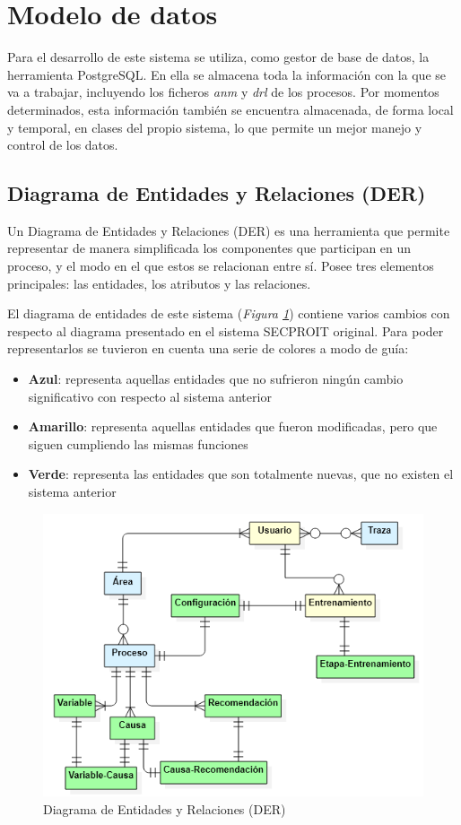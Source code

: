 
\section{Modelo de datos}
Para el desarrollo de este sistema se utiliza, como gestor de base de datos, la herramienta PostgreSQL. En ella se almacena toda la información con la que se va a trabajar, incluyendo los ficheros \textsl{anm} y \textsl{drl} de los procesos. Por momentos determinados, esta información también se encuentra almacenada, de forma local y temporal, en clases del propio sistema, lo que permite un mejor manejo y control de los datos.

\subsection{Diagrama de Entidades y Relaciones (DER)}
Un Diagrama de Entidades y Relaciones (DER) es una herramienta que permite representar de manera simplificada los componentes que participan en un proceso, y el modo en el que estos se relacionan entre sí. Posee tres elementos principales: las entidades, los atributos y las relaciones. %

El diagrama de entidades de este sistema (\textsl{Figura \ref{fig:der}}) contiene varios cambios con respecto al diagrama presentado en el sistema SECPROIT original. Para poder representarlos se tuvieron en cuenta una serie de colores a modo de guía:

\begin{itemize}
\item \textbf{Azul}: representa aquellas entidades que no sufrieron ningún cambio significativo con respecto al sistema anterior
\item \textbf{Amarillo}: representa aquellas entidades que fueron modificadas, pero que siguen cumpliendo las mismas funciones
\item \textbf{Verde}: representa las entidades que son totalmente nuevas, que no existen el sistema anterior
\end{itemize}

\begin{figure}[h]
\centering
 \includegraphics[width=0.6\linewidth]{imagen/der.png}
 \caption{Diagrama de Entidades y Relaciones (DER)}
 \label{fig:der} 
\end{figure}

